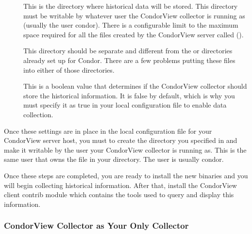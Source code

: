 \begin{description}

\item[] This is the directory where
historical data will be stored.
This directory must be writable by whatever user the CondorView
collector is running as (usually the user condor).  
There is a configurable limit to the maximum space required for all
the files created by the CondorView server called
(). 

\Note This directory should be separate and different from the
 or  directories already set up for
Condor.
There are a few problems putting these files into either of those
directories.

\item[] This is a boolean value that determines
if the CondorView collector should store the historical information.
It is false by default, which is why you must specify it as true in
your local configuration file to enable data collection.

\end{description}

Once these settings are in place in the local configuration file for your
CondorView server host, you must to create the directory you specified
in  and make it writable by the user your
CondorView collector is running as.
This is the same user that owns the  file in
your  directory. The user is usually condor.

Once these steps are completed, you are ready to install the new
binaries and you will begin collecting historical information.
After that, install the CondorView client contrib module which
contains the tools used to query and display this information.

\subsubsection{\label{sec:CondorView-Server-Only}
CondorView Collector as Your Only Collector} 

